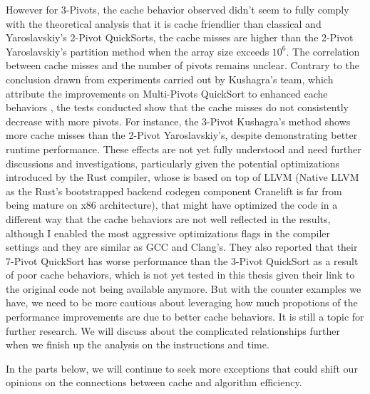 \documentclass{article}
\begin{document}
However for 3-Pivots, the cache behavior observed didn't seem to fully comply with the theoretical analysis that it is cache friendlier than classical and Yaroslavskiy's 2-Pivot QuickSorts, 
the cache misses are higher than the 2-Pivot Yaroslavskiy's partition method when the array size exceeds $10^6$. The correlation between cache misses and the number of pivots remains unclear.
Contrary to the conclusion drawn from experiments carried out by Kushagra's team, which attribute the improvements on Multi-Pivots QuickSort to enhanced cache behaviors
\cite{Kushagra}, the tests conducted show that the cache misses do not consistently decrease with more pivots. For instance, the 3-Pivot Kushagra's method shows more cache misses than the 2-Pivot Yaroslavskiy's,
despite demonstrating better runtime performance. These effects are not yet fully understood and need further discussions and investigations, particularly given the potential optimizations introduced by the Rust compiler,
whose is based on top of LLVM (Native LLVM as the Rust's bootstrapped backend codegen component Cranelift is far from being mature on x86 architecture), that might have optimized the code in a different way that the cache behaviors are not well reflected in the results, although I enabled the most aggressive optimizations flags in the compiler settings
and they are similar as GCC and Clang's. They also reported that their 7-Pivot QuickSort has worse performance than the 3-Pivot QuickSort as a result of poor cache behaviors, which is not yet tested in this thesis given their link to the original code not being available anymore.
But with the counter examples we have, we need to be more cautious about leveraging how much propotions of the performance improvements are due to better cache behaviors. It is still a topic for further research.
We will discuss about the complicated relationships further when we finish up the analysis on the instructions and time.

In the parts below, we will continue to seek more exceptions that could shift our opinions on the connections between cache and algorithm efficiency.
\end{document}
